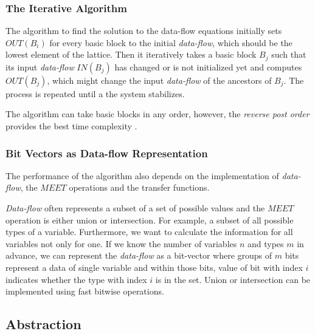        \subsubsection*{The Iterative Algorithm}
        
        The algorithm to find the solution to the data-flow equations 
        initially sets $OUT(B_i)$ for every basic block to the initial 
        \emph{data-flow}, which should be the lowest element of the lattice. 
        Then it iteratively takes a basic block $B_j$ such that 
        its input \emph{data-flow} $IN(B_j)$ has changed or is not 
        initialized yet and computes $OUT(B_j)$, which might change 
        the input \emph{data-flow} of the ancestors of $B_j$. 
        The process is repeated until a the system stabilizes. 
        
        The algorithm can take basic blocks in any order, however, 
        the \emph{reverse post order} provides the best time complexity 
        \cite{aho1985compilers}.
        
        \subsubsection*{Bit Vectors as Data-flow Representation}

        The performance of the algorithm also depends on the implementation 
        of \emph{data-flow}, the $\textit{MEET}$ operations and the transfer 
        functions. 
        
        \emph{Data-flow} often represents a subset of a set of possible values 
        and the $\textit{MEET}$ operation is either union or intersection.
        For example, a subset of all possible types of a variable. 
        Furthermore, we want to calculate the information for all 
        variables not only for one. If we know the number of variables $n$ and 
        types $m$ in advance, we can represent the \emph{data-flow} as 
        a bit-vector where groups of $m$ bits represent a data of 
        single variable and within those bits, value of bit with 
        index $i$ indicates whether the type with index $i$ is in the set. 
        Union or intersection can be implemented using fast bitwise operations.


        \subsection{Abstraction}
        
